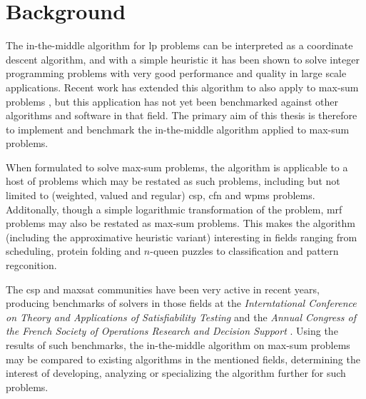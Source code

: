 \section{Background}
The in-the-middle algorithm \parencite{Wedelin95} for \acrlong{lp} problems can be interpreted as a coordinate descent algorithm, and with a simple heuristic it has been shown to solve integer programming problems with very good performance and quality in large scale applications.
Recent work has extended this algorithm to also apply to max-sum problems \parencites{Wedelin08}{Wedelin13}, but this application has not yet been benchmarked against other algorithms and software in that field.
The primary aim of this thesis is therefore to implement and benchmark the in-the-middle algorithm applied to max-sum problems.

When formulated to solve max-sum problems, the algorithm is applicable to a host of problems which may be restated as such problems, including but not limited to (weighted, valued and regular) \gls{csp}, \gls{cfn} and \gls{wpms} problems.
Additonally, though a simple logarithmic transformation of the problem, \gls{mrf} problems may also be restated as max-sum problems.
This makes the algorithm (including the approximative heuristic variant) interesting in fields ranging from scheduling, protein folding and \(n\)-queen puzzles to classification and pattern regconition.

The \gls{csp} and \gls{maxsat} communities have been very active in recent years, producing benchmarks of solvers in those fields at the \emph{Interntational Conference on Theory and Applications of Satisfiability Testing} \parencite{Argelich11} and the \emph{Annual Congress of the French Society of Operations Research and Decision Support} \parencite{Allouche14b}.
Using the results of such benchmarks, the in-the-middle algorithm on max-sum problems may be compared to existing algorithms in the mentioned fields, determining the interest of developing, analyzing or specializing the algorithm further for such problems.
